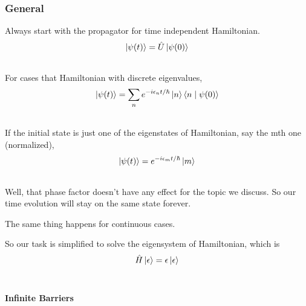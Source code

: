 \documentclass[letterpaper,10pt,english]{sphinxmanual}
\newcommand{\ket}[1]{\left| #1\right\rangle}
\newcommand{\braket}[2]{\langle #1 \mid #2 \rangle}
\begin{document}
\subsubsection{General}
\label{QuantumMechanics:general}
Always start with the propagator for time independent Hamiltonian.
\begin{gather}
\begin{split}\ket{\psi(t)} = \hat U \ket{\psi(0)}\end{split}\notag\\\begin{split}\end{split}\notag
\end{gather}
For cases that Hamiltonian with discrete eigenvalues,
\begin{gather}
\begin{split}\ket{\psi(t)} = \sum _ n e^{-i \epsilon _ n t/ \hbar } \ket{n}\braket{n}{\psi(0)}\end{split}\notag\\\begin{split}\end{split}\notag
\end{gather}
If the initial state is just one of the eigenstates of Hamiltonian, say the mth one (normalized),
\begin{gather}
\begin{split}\ket{\psi(t)} = e^{- i \epsilon _ m t/\hbar} \ket{ m }\end{split}\notag\\\begin{split}\end{split}\notag
\end{gather}
Well, that phase factor doesn't have any effect for the topic we discuss. So our time evolution will stay on the same state forever.

The same thing happens for continuous cases.

So our task is simplified to solve the eigensystem of Hamiltonian, which is
\begin{gather}
\begin{split}\hat H \ket{\epsilon} = \epsilon \ket{\epsilon}\end{split}\notag\\\begin{split}\end{split}\notag
\end{gather}

\paragraph{Infinite Barriers}
\label{QuantumMechanics:infinite-barriers}
\end{document}
